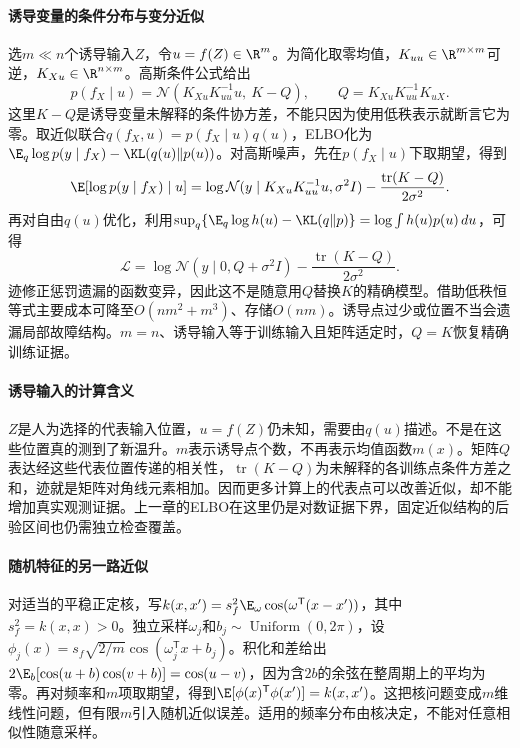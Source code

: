 \paragraph{诱导变量的条件分布与变分近似}
选$m\ll n$个诱导输入$Z$，令$u=f(Z)\in\R^m$。为简化取零均值，$K_{uu}\in\R^{m\times m}$可逆，$K_{Xu}\in\R^{n\times m}$。高斯条件公式给出
\begin{equation}
 p(f_X\mid u)=\mathcal N(K_{Xu}K_{uu}^{-1}u,\ K-Q),\qquad
 Q=K_{Xu}K_{uu}^{-1}K_{uX}.
\end{equation}
这里$K-Q$是诱导变量未解释的条件协方差，不能只因为使用低秩表示就断言它为零。取近似联合$q(f_X,u)=p(f_X\mid u)q(u)$，ELBO化为$\E_q\log p(y\mid f_X)-\KL(q(u)\|p(u))$。对高斯噪声，先在$p(f_X\mid u)$下取期望，得到
\begin{equation}
 \E[\log p(y\mid f_X)\mid u]
 =\log\mathcal N(y\mid K_{Xu}K_{uu}^{-1}u,\sigma^2I)
 -\frac{\operatorname{tr}(K-Q)}{2\sigma^2}.
\end{equation}
再对自由$q(u)$优化，利用$\sup_q\{\E_q\log h(u)-\KL(q\|p)\}=\log\int h(u)p(u)\,du$，可得
\begin{equation}
 \mathcal L=\log\mathcal N(y\mid0,Q+\sigma^2I)
 -\frac{\operatorname{tr}(K-Q)}{2\sigma^2}.
\end{equation}
迹修正惩罚遗漏的函数变异，因此这不是随意用$Q$替换$K$的精确模型。借助低秩恒等式主要成本可降至$O(nm^2+m^3)$、存储$O(nm)$。诱导点过少或位置不当会遗漏局部故障结构。$m=n$、诱导输入等于训练输入且矩阵适定时，$Q=K$恢复精确训练证据。

\paragraph{诱导输入的计算含义}
$Z$是人为选择的代表输入位置，$u=f(Z)$仍未知，需要由$q(u)$描述。不是在这些位置真的测到了新温升。$m$表示诱导点个数，不再表示均值函数$m(x)$。矩阵$Q$表达经这些代表位置传递的相关性，$\operatorname{tr}(K-Q)$为未解释的各训练点条件方差之和，迹就是矩阵对角线元素相加。因而更多计算上的代表点可以改善近似，却不能增加真实观测证据。上一章的ELBO在这里仍是对数证据下界，固定近似结构的后验区间也仍需独立检查覆盖。

\paragraph{随机特征的另一路近似}
对适当的平稳正定核，写$k(x,x')=s_f^2\E_\omega\cos(\omega^{\mathsf T}(x-x'))$，其中$s_f^2=k(x,x)>0$。独立采样$\omega_j$和$b_j\sim\operatorname{Uniform}(0,2\pi)$，设$\phi_j(x)=s_f\sqrt{2/m}\cos(\omega_j^{\mathsf T}x+b_j)$。积化和差给出$2\E_b[\cos(u+b)\cos(v+b)]=\cos(u-v)$，因为含$2b$的余弦在整周期上的平均为零。再对频率和$m$项取期望，得到$\E[\phi(x)^{\mathsf T}\phi(x')]=k(x,x')$。这把核问题变成$m$维线性问题，但有限$m$引入随机近似误差。适用的频率分布由核决定，不能对任意相似性随意采样。

